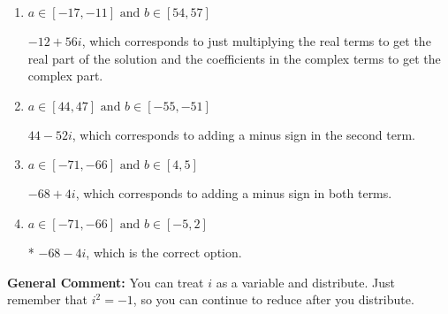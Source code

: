 \documentclass{extbook}[14pt]
\begin{document}
\begin{enumerate}
{\begin{enumerate}[label=\Alph*.]
 $44 + 52 i$, which corresponds to adding a minus sign in the first term.
\item \( a \in [-17, -11] \text{ and } b \in [54, 57] \)

 $-12 + 56 i$, which corresponds to just multiplying the real terms to get the real part of the solution and the coefficients in the complex terms to get the complex part.
\item \( a \in [44, 47] \text{ and } b \in [-55, -51] \)

 $44 - 52 i$, which corresponds to adding a minus sign in the second term.
\item \( a \in [-71, -66] \text{ and } b \in [4, 5] \)

 $-68 + 4 i$, which corresponds to adding a minus sign in both terms.
\item \( a \in [-71, -66] \text{ and } b \in [-5, 2] \)

* $-68 - 4 i$, which is the correct option.
\end{enumerate}

\textbf{General Comment:} You can treat $i$ as a variable and distribute. Just remember that $i^2=-1$, so you can continue to reduce after you distribute.
}
\end{enumerate}
\end{document}
